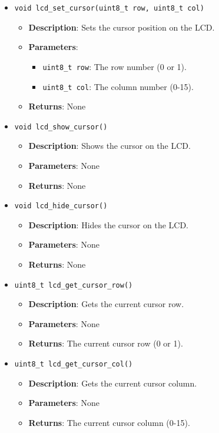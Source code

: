 \documentclass{article}
\begin{document}
\begin{itemize}
   \item \texttt{void lcd\_set\_cursor(uint8\_t row, uint8\_t col)}
   \begin{itemize}
      \item \textbf{Description}: Sets the cursor position on the LCD.
      \item \textbf{Parameters}:
      \begin{itemize}
         \item \texttt{uint8\_t row}: The row number (0 or 1).
         \item \texttt{uint8\_t col}: The column number (0-15).
      \end{itemize}
      \item \textbf{Returns}: None
   \end{itemize}

   \item \texttt{void lcd\_show\_cursor()}
   \begin{itemize}
      \item \textbf{Description}: Shows the cursor on the LCD.
      \item \textbf{Parameters}: None
      \item \textbf{Returns}: None
   \end{itemize}

   \item \texttt{void lcd\_hide\_cursor()}
   \begin{itemize}
      \item \textbf{Description}: Hides the cursor on the LCD.
      \item \textbf{Parameters}: None
      \item \textbf{Returns}: None
   \end{itemize}

   \item \texttt{uint8\_t lcd\_get\_cursor\_row()}
   \begin{itemize}
      \item \textbf{Description}: Gets the current cursor row.
      \item \textbf{Parameters}: None
      \item \textbf{Returns}: The current cursor row (0 or 1).
   \end{itemize}

   \item \texttt{uint8\_t lcd\_get\_cursor\_col()}
   \begin{itemize}
      \item \textbf{Description}: Gets the current cursor column.
      \item \textbf{Parameters}: None
      \item \textbf{Returns}: The current cursor column (0-15).
   \end{itemize}
\end{itemize}
\end{document}

